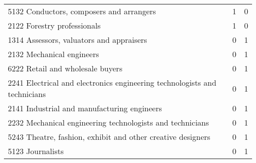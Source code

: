 \begin{table}[ht]
\begin{tabular}{lcc}
  5132 Conductors, composers and arrangers &   1 &   0 \\ 
  2122 Forestry professionals &   1 &   0 \\ 
  1314 Assessors, valuators and appraisers &   0 &   1 \\ 
  2132 Mechanical engineers &   0 &   1 \\ 
  6222 Retail and wholesale buyers &   0 &   1 \\ 
  2241 Electrical and electronics engineering technologists and technicians &   0 &   1 \\ 
  2141 Industrial and manufacturing engineers &   0 &   1 \\ 
  2232 Mechanical engineering technologists and technicians &   0 &   1 \\ 
  5243 Theatre, fashion, exhibit and other creative designers &   0 &   1 \\ 
  5123 Journalists &   0 &   1 \\ 
   \hline
\end{tabular}
\end{table}
